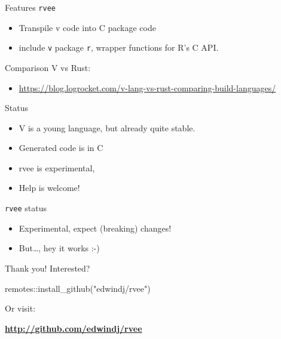 \documentclass[
  ignorenonframetext,
]{beamer}
\newenvironment{Shaded}{\begin{snugshade}}{\end{snugshade}}
\newcommand{\FunctionTok}[1]{\textcolor[rgb]{0.00,0.00,0.00}{#1}}
\newcommand{\NormalTok}[1]{#1}
\newcommand{\SpecialCharTok}[1]{\textcolor[rgb]{0.00,0.00,0.00}{#1}}
\newcommand{\StringTok}[1]{\textcolor[rgb]{0.31,0.60,0.02}{#1}}
\providecommand{\tightlist}{%
  \setlength{\itemsep}{0pt}\setlength{\parskip}{0pt}}
\begin{document}
\begin{frame}[fragile]{Features \texttt{rvee}}
\protect\hypertarget{features-rvee}{}
\begin{itemize}
\tightlist
\item
  Transpile v code into C package code
\item
  include \texttt{v} package \texttt{r}, wrapper functions for R's C
  API.
\end{itemize}
\end{frame}

\begin{frame}{}
\protect\hypertarget{section-1}{}
Comparison V vs Rust:

\begin{itemize}
\tightlist
\item
  \url{https://blog.logrocket.com/v-lang-vs-rust-comparing-build-languages/}
\end{itemize}
\end{frame}

\begin{frame}{Status}
\protect\hypertarget{status}{}
\begin{itemize}
\item
  V is a young language, but already quite stable.
\item
  Generated code is in C
\item
  rvee is experimental,
\item
  Help is welcome!
\end{itemize}
\end{frame}

\begin{frame}{\texttt{rvee} status}
\protect\hypertarget{rvee-status}{}
\begin{itemize}
\tightlist
\item
  Experimental, expect (breaking) changes!
\item
  But\ldots, hey it works :-)
\end{itemize}
\end{frame}

\begin{frame}[fragile]{Thank you!}
\protect\hypertarget{thank-you}{}
\Large Interested?

\begin{Shaded}
\begin{Highlighting}[]
\NormalTok{remotes}\SpecialCharTok{::}\FunctionTok{install\_github}\NormalTok{(}\StringTok{"edwindj/rvee"}\NormalTok{)}
\end{Highlighting}
\end{Shaded}

Or visit:

\href{http://github.com/edwindj/rvee}{\textbf{http://github.com/edwindj/rvee}}
\end{frame}
\end{document}
